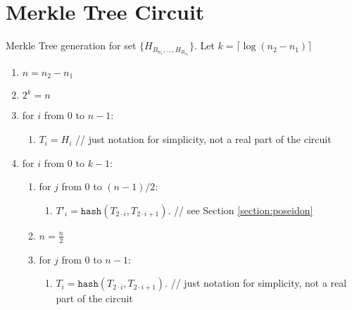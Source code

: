 \section{Merkle Tree Circuit}
\label{section:merkle}

Merkle Tree generation for set $\{H_{B_{n_1}, ..., H_{B_{n_2}}}\}$.
Let $k = \lceil \log(n_2 - n_1) \rceil$

\begin{enumerate}
	\item $n = n_2 - n_1$
	\item $2^k = n$
	\item for $i$ from $0$ to $n - 1$:
	\begin{enumerate}
		\item $T_i = H_i$ // just notation for simplicity, not a real part of the circuit
	\end{enumerate}
	\item for $i$ from $0$ to $k - 1$:
	\begin{enumerate}
		\item for $j$ from $0$ to $(n - 1) / 2$:
		\begin{enumerate}
			\item $T'_i = \texttt{hash}(T_{2 \cdot  i}, T_{2 \cdot i + 1})$. // see Section \ref{section:poseidon}
		\end{enumerate}
		\item $n = \frac{n}{2}$
		\item for $j$ from $0$ to $n - 1$:
		\begin{enumerate}
			\item $T_i = \texttt{hash}(T_{2 \cdot  i}, T_{2 \cdot i + 1})$. // just notation for simplicity, not a real part of the circuit
		\end{enumerate}
	\end{enumerate}
\end{enumerate}
